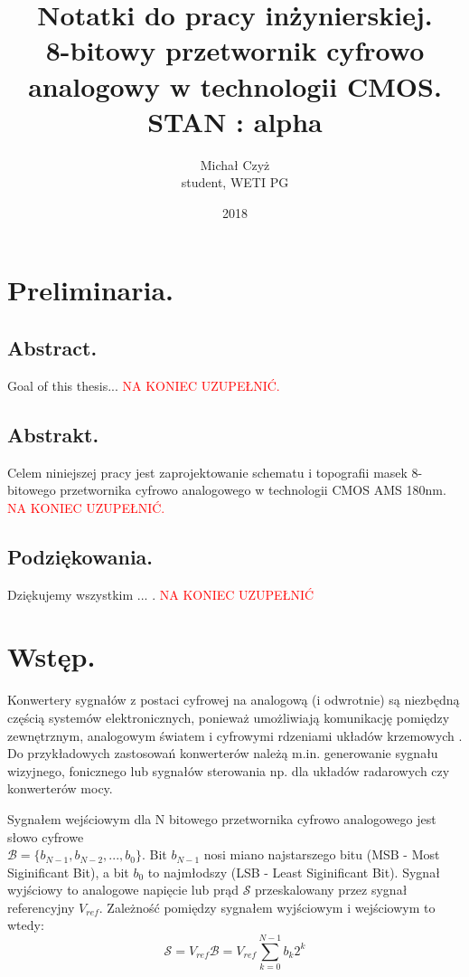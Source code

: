 \documentclass[10pt,a4paper]{report}
\title{Notatki do pracy inżynierskiej. \\ 8-bitowy przetwornik cyfrowo analogowy w technologii CMOS. \\ STAN : alpha}
\date{2018}
\author{Michał Czyż \\ student, WETI PG}
\begin{document}
	\maketitle
	
	\tableofcontents
	\newpage
	\chapter{Preliminaria.}
	\section{Abstract.}
	{	Goal of this thesis... \textcolor{red}{NA KONIEC UZUPEŁNIĆ.} }

	\section{Abstrakt.}
	{	Celem niniejszej pracy jest zaprojektowanie schematu i topografii masek 8-bitowego przetwornika cyfrowo analogowego w technologii CMOS AMS 180nm. \textcolor{red}{NA KONIEC UZUPEŁNIĆ.} }
	
	\section{Podziękowania.}
	{	Dziękujemy wszystkim ... . \textcolor{red}{NA KONIEC UZUPEŁNIĆ} }
	
	\chapter{Wstęp.}
	{	Konwertery sygnałów z postaci cyfrowej na analogową (i odwrotnie) są niezbędną częścią systemów elektronicznych, ponieważ umożliwiają komunikację pomiędzy zewnętrznym, analogowym światem i cyfrowymi rdzeniami układów krzemowych \cite{integconv}. Do przykładowych zastosowań konwerterów należą m.in. generowanie sygnału wizyjnego, fonicznego lub sygnałów sterowania np. dla układów radarowych czy konwerterów mocy. }
	
	{	Sygnałem wejściowym dla N bitowego przetwornika cyfrowo analogowego jest słowo cyfrowe \\ $\mathcal{B}=\{b_{N-1},b_{N-2},...,b_0\}$. Bit $b_{N-1}$ nosi miano najstarszego bitu (MSB - Most Siginificant Bit), a bit $b_0$ to najmłodszy (LSB - Least Siginificant Bit). Sygnał wyjściowy to analogowe napięcie lub prąd $\mathcal{S}$ przeskalowany przez sygnał referencyjny $V_{ref}$. Zależność pomiędzy sygnałem wyjściowym i wejściowym to wtedy:
	\begin{equation}
	\mathcal{S} = V_{ref}\mathcal{B} = V_{ref} {\sum_{k=0}^{N-1} b_k2^k}
	\end{equation}

	}
	
\end{document}
